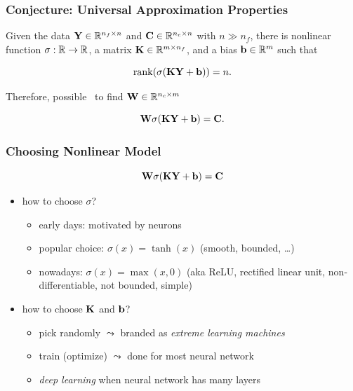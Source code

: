\documentclass[12pt,fleqn,handout]{beamer}
\begin{document}
\begin{frame}[fragile]\frametitle{Conjecture: Universal Approximation Properties}

Given the data ${\bf Y} \in \mathbb{R}^{n_f \times n}$ and ${\bf C} \in \mathbb{R}^{n_c \times n}$
with $n\gg n_f$, there is nonlinear function $\sigma:\mathbb{R} \to \mathbb{R}$, a matrix ${\bf K} \in \mathbb{R}^{m \times n_f}$, and a bias ${\bf b} \in \mathbb{R}^m$ such that

$$
 {\rm rank}(\sigma({\bf K} {\bf Y} + {\bf b})) = n.
$$

\bigskip
\pause
Therefore, possible~\cite{Cybenko1989,HornikEtAl1989} to find ${{\bf W}}\in\mathbb{R}^{n_c\times m}$

$${\bf W} \sigma( {\bf K} {\bf Y} + {\bf b}) = {\bf C}.$$

\end{frame}


\begin{frame}[fragile]\frametitle{Choosing Nonlinear Model}

$$ {\bf W}  \sigma({\bf K} {\bf Y}+ {\bf b})= {\bf C} $$
\begin{itemize}
\item how to choose $\sigma$?
\pause
\begin{itemize}
	\item early days: motivated by neurons
	\item popular choice: $\sigma(x) = \tanh(x)$ (smooth, bounded, \ldots)
	\item nowadays: $\sigma(x) = \max(x,0)$ (aka ReLU, rectified linear unit, non-differentiable, not bounded, simple)
\end{itemize}
\pause
\item how to choose ${\bf K}$ and ${\bf b}$?
\pause
\begin{itemize}
	\item pick randomly $\leadsto$ branded as \emph{extreme learning machines}~\cite{HuangEtAl2006}
	\item train (optimize) $\leadsto$ done for most neural network
	\item \emph{deep learning} when neural network has many layers
\end{itemize}
\end{itemize}


\end{frame}
\end{document}
